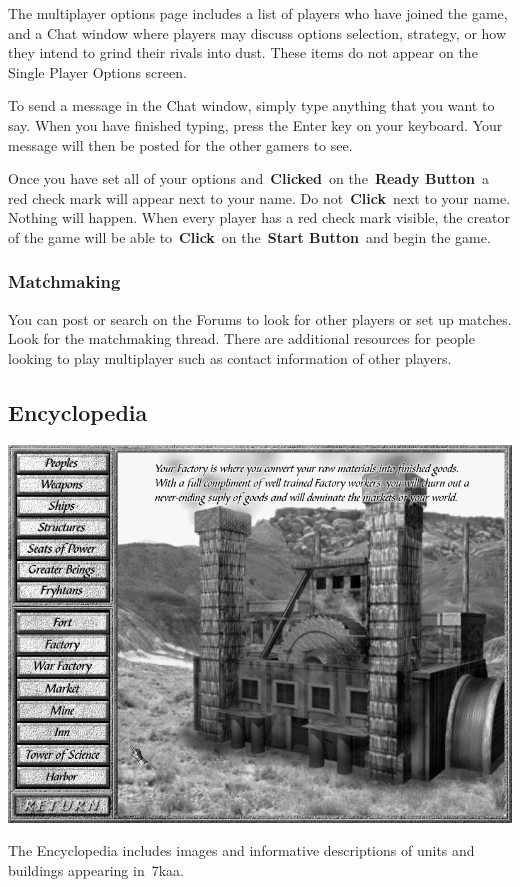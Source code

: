 The multiplayer options page includes a list of players who have joined the game, and a Chat window where players may discuss options selection, strategy, or how they intend to grind their rivals into dust. These items do not appear on the Single Player Options screen.

To send a message in the Chat window, simply type anything that you want to say. When you have finished typing, press the Enter key on your keyboard. Your message will then be posted for the other gamers to see.

Once you have set all of your options and \textbf{Clicked} on the \textbf{Ready Button} a red check mark will appear next to your name. Do not \textbf{Click} next to your name. Nothing will happen. When every player has a red check mark visible, the creator of the game will be able to \textbf{Click} on the \textbf{Start Button} and begin the game.

\subsubsection{Matchmaking}

You can post or search on the Forums to look for other players or set up matches. Look for the matchmaking thread. There are additional resources for people looking to play multiplayer such as contact information of other players.

\subsection{Encyclopedia}

\begin{center}
	\includegraphics[width=0.7\linewidth]{Iencyclopedia}
\end{center}

The Encyclopedia includes images and informative descriptions of units and buildings appearing in 7kaa.

